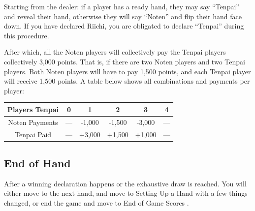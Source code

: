 Starting from the dealer: if a player has a ready hand, they may say ``Tenpai'' and reveal their hand, otherwise they will say ``Noten'' and flip their hand face down. If you have declared Riichi, you are obligated to declare ``Tenpai'' during this procedure.

After which, all the Noten players will collectively pay the Tenpai players collectively 3,000 points. That is, if there are two Noten players and two Tenpai players. Both Noten players will have to pay 1,500 points, and each Tenpai player will receive 1,500 points. A table below shows all combinations and payments per player:

\begin{center}\begin{tabular}{|c||ccccc|}\hline
Players Tenpai & 0 & 1 & 2 & 3 & 4 \\ \hline
Noten Payments & --- & -1,000 & -1,500 & -3,000 & --- \\
Tenpai Paid & --- & +3,000 & +1,500 & +1,000 & --- \\\hline
\end{tabular}\end{center}

\subsection{End of Hand}\label{core:ssec:end-of-hand}

After a winning declaration happens or the exhaustive draw is reached. You will either move to the next hand, and move to Setting Up a Hand  with a few things changed, or end the game and move to End of Game Scores .

